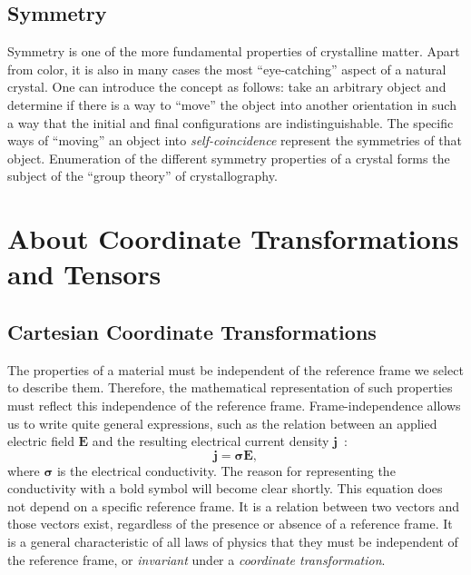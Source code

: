 \subsection{Symmetry}

Symmetry is one of the more fundamental properties of crystalline matter.  Apart from color, it is also in many cases the most ``eye-catching'' aspect of a natural crystal.  One can introduce the concept as follows: take an arbitrary object and determine if there is a way to ``move'' the object into another orientation in such a way that the initial and final configurations are indistinguishable.  The specific ways of ``moving'' an object into \textit{self-coincidence} represent the symmetries of that object.  Enumeration of the different symmetry properties of a crystal forms the subject of the ``group theory'' of crystallography.


\section{About Coordinate Transformations and Tensors}
\label{sec:transformations1}

\subsection[Cartesian Coordinate Transformations]{Cartesian Coordinate Transformations}

The properties of a material must be independent of the reference 
frame we select to describe them.  Therefore, the mathematical 
representation of such properties must reflect this independence of 
the reference frame.  Frame-independence allows us to write quite 
general expressions, such as the relation between an applied electric 
field $\mathbf{E}$ and the resulting electrical current density 
$\mathbf{j}$~:
\begin{equation}
	\mathbf{j}=\bm{\sigma}\mathbf{E},\label{eq:conductivity}
\end{equation}
where $\bm{\sigma}$ is the electrical conductivity.  The reason for 
representing the conductivity with a bold symbol will become clear shortly.
This equation does not depend on a specific reference frame. It is a relation between two vectors
and those vectors exist, regardless of the presence or absence of a reference frame.
It is a general characteristic of all laws of physics that they must be 
independent of the reference frame, or \textit{invariant} under a 
\textit{coordinate transformation}.

